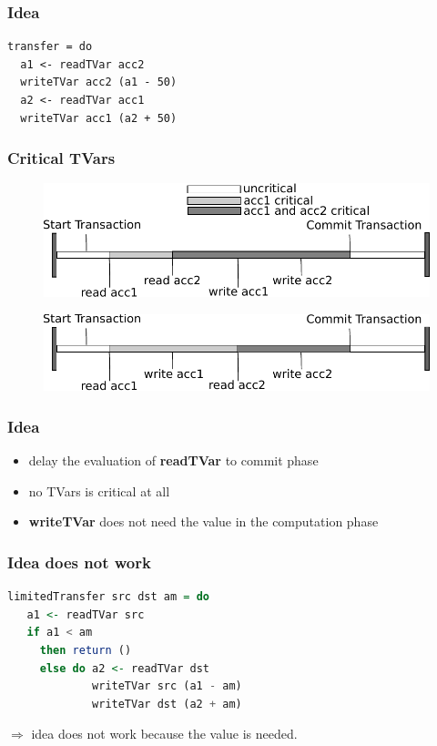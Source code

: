 \documentclass{beamer}
\newcommand{\code}[1]{\textbf{#1}}
\begin{document}
\begin{frame}[fragile]
\frametitle{Idea}
\begin{lstlisting}
transfer = do 
  a1 <- readTVar acc2
  writeTVar acc2 (a1 - 50)
  a2 <- readTVar acc1
  writeTVar acc1 (a2 + 50)
\end{lstlisting}
\end{frame}
  
     
  \begin{frame}
   \frametitle{Critical TVars}
   \begin{figure}
    \includegraphics[scale=0.7]{ressources/CriticalValue.pdf}
   \end{figure}
   \begin{figure}
    \includegraphics[scale=0.7]{ressources/CriticalValue2.pdf}
   \end{figure}
   \end{frame}

\begin{frame}
 \frametitle{Idea}
 \begin{itemize}\setlength\itemsep{1em}
  \item delay the evaluation of \code{readTVar} to commit phase
  \item no TVars is critical at all  
  \item \code{writeTVar} does not need the value in the computation phase
 \end{itemize}
\end{frame}
  
\begin{frame}[fragile]
   \frametitle{Idea does not work}
   \begin{lstlisting}[language=Haskell]
limitedTransfer src dst am = do
   a1 <- readTVar src
   if a1 < am
     then return ()
     else do a2 <- readTVar dst
             writeTVar src (a1 - am)
             writeTVar dst (a2 + am)
   \end{lstlisting}
   \vfill
   $\Rightarrow$ idea does not work because the value is needed.
\end{frame}
\end{document}
